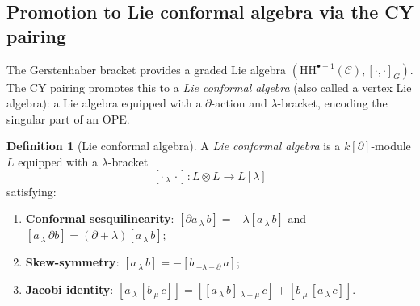 \documentclass[11pt]{article}
\theoremstyle{plain}
\theoremstyle{definition}
\newtheorem{definition}[theorem]{Definition}
\theoremstyle{remark}
\newcommand{\HH}{\mathrm{HH}}
\newcommand{\cC}{\mathcal{C}}
\begin{document}
\subsection{Promotion to Lie conformal algebra via the CY pairing}
\label{sec:lie-conformal}

The Gerstenhaber bracket provides a graded Lie algebra $(\HH^{\bullet+1}(\cC), [\cdot, \cdot]_G)$. The CY pairing promotes this to a \emph{Lie conformal algebra} (also called a vertex Lie algebra): a Lie algebra equipped with a $\partial$-action and $\lambda$-bracket, encoding the singular part of an OPE.

\begin{definition}[Lie conformal algebra]
\label{def:lie-conformal}
A \emph{Lie conformal algebra} is a $k[\partial]$-module $L$ equipped with a $\lambda$-bracket
\[
[\cdot\,{}_\lambda\,\cdot] \colon L \otimes L \longrightarrow L[\lambda]
\]
satisfying:
\begin{enumerate}[label=(\roman*)]
\item \textbf{Conformal sesquilinearity}: $[\partial a \,{}_\lambda\, b] = -\lambda [a \,{}_\lambda\, b]$ and $[a \,{}_\lambda\, \partial b] = (\partial + \lambda)[a \,{}_\lambda\, b]$;
\item \textbf{Skew-symmetry}: $[a \,{}_\lambda\, b] = -[b \,{}_{-\lambda - \partial}\, a]$;
\item \textbf{Jacobi identity}: $[a \,{}_\lambda\, [b \,{}_\mu\, c]] = [[a \,{}_\lambda\, b] \,{}_{\lambda+\mu}\, c] + [b \,{}_\mu\, [a \,{}_\lambda\, c]]$.
\end{enumerate}
\end{definition}
\end{document}
